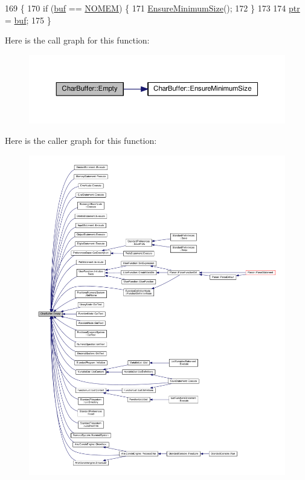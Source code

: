 \begin{DoxyCode}
169 \{
170     \textcolor{keywordflow}{if} (\hyperlink{classCharBuffer_a8bcd8491b24db4197b311eb361609674}{buf} == \hyperlink{platform_8h_a46ff2bfbf0d44b8466a2251d5bd5e6f8}{NOMEM}) \{
171         \hyperlink{classCharBuffer_ae742439a2d5d5a0ad64411dcbf4604c8}{EnsureMinimumSize}();
172     \}
173 
174     \hyperlink{classCharBuffer_a2d313433650506fd6609e6947729dfb0}{ptr} = \hyperlink{classCharBuffer_a8bcd8491b24db4197b311eb361609674}{buf};
175 \}
\end{DoxyCode}


Here is the call graph for this function\+:\nopagebreak
\begin{figure}[H]
\begin{center}
\leavevmode
\includegraphics[width=350pt]{classCharBuffer_abe39d3fd7d8b9c8ec343af2cae7adc96_cgraph}
\end{center}
\end{figure}




Here is the caller graph for this function\+:\nopagebreak
\begin{figure}[H]
\begin{center}
\leavevmode
\includegraphics[width=350pt]{classCharBuffer_abe39d3fd7d8b9c8ec343af2cae7adc96_icgraph}
\end{center}
\end{figure}


